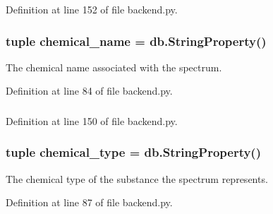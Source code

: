 Definition at line 152 of file backend.py.

\hypertarget{classbackend_1_1_spectrum_a1a3576819984b70e068fa2a43a5b11df}{
\subsubsection[{chemical\_\-name}]{\setlength{\rightskip}{0pt plus 5cm}tuple {\bf chemical\_\-name} = db.StringProperty()}}
\label{classbackend_1_1_spectrum_a1a3576819984b70e068fa2a43a5b11df}


The chemical name associated with the spectrum. 



Definition at line 84 of file backend.py.

\hypertarget{classbackend_1_1_spectrum_ab23a1bfe0956557e254961031d578c23}{
\subsubsection[{chemical\_\-type}]{}}
\label{classbackend_1_1_spectrum_ab23a1bfe0956557e254961031d578c23}


Definition at line 150 of file backend.py.

\hypertarget{classbackend_1_1_spectrum_a97fd097feb78cab8b04a2ffd17a971d4}{
\subsubsection[{chemical\_\-type}]{\setlength{\rightskip}{0pt plus 5cm}tuple {\bf chemical\_\-type} = db.StringProperty()}}
\label{classbackend_1_1_spectrum_a97fd097feb78cab8b04a2ffd17a971d4}


The chemical type of the substance the spectrum represents. 



Definition at line 87 of file backend.py.

